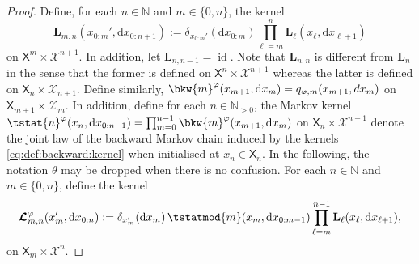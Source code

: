 \documentclass{article}
\newcommand{\Xfd}{\mathcal{X}}
\newcommand{\precpar}{\varphi}
\newcommand{\intvect}[2]{\{ #1, #2 \}}
\newcommand{\nset}{\mathbb{N}}
\newcommand{\nsetpos}{\mathbb{N}_{> 0}}
\newcommand{\1}{\mathbbm{1}}
\newcommand{\retrokmod}{\boldsymbol{\mathcal{L}}^\precpar}
\newcommand{\uk}[1]{\mathbf{L}_{#1}}
\newcommand{\tensprod}{\otimes}
\newcommand{\Xset}{\mathsf{X}}
\newcommand{\parvec}{\theta}
\newcommand{\bmf}[1]{\set{F}(#1)}
\newcommand{\set}[1]{\mathsf{#1}}
\newcommand{\rmd}{\ensuremath{\mathrm{d}}}
\newcommand{\eqdef}{\ensuremath{:=}}
\begin{document}
\begin{proof}
Define, for each $n \in \nset$ and $m \in \intvect{0}{n}$, the kernel 
\begin{equation} \label{eq:def:uk:products}
    \uk{m, n}(x_{0:m}', \rmd x_{0:n + 1}) \eqdef \delta_{x_{0:m}'}(\rmd x_{0:m}) \prod_{\ell = m}^n \uk{\ell}(x_\ell, \rmd x_{\ell + 1}) 
\end{equation}
on $\Xset^m \times \Xfd^{n + 1}$. In addition, let $\uk{n, n - 1} = \operatorname{id}$. Note that $\uk{n, n}$ is different from $\uk{n}$ in the sense that the former is defined on $\Xset^n \times \Xfd^{n + 1}$ whereas the latter is defined on $\Xset_n \times \Xfd_{n + 1}$. Define similarly, $\bkw{m}^\varphi(x_{m + 1}, \rmd x_m) = q_{\varphi,m}(x_{m+1},dx_m)$
on $\Xset_{m + 1} \times \Xfd_m$. In addition, define for each $n \in \nsetpos$, the Markov kernel  $\tstat{n}^\varphi(x_n, \rmd x_{0:n - 1}) = \prod_{m = 0}^{n - 1} \bkw{m}^\varphi(x_{m + 1}, \rmd x_m)$ on $\Xset_n \times \Xfd^{n - 1}$ denote the joint law of the backward Markov chain induced by the kernels \eqref{eq:def:backward:kernel} when initialised at $x_n \in \Xset_n$.  In the following, the notation $\parvec$ may be dropped when there is no confusion. 
 For each $n \in \nset$ and $m \in \intvect{0}{n}$, define the kernel  
\begin{equation} \label{eq:def:retrokmod}
    \retrokmod_{m, n}(x_m', \rmd x_{0:n}) \eqdef \delta_{x_m'}(\rmd x_m) \, \tstatmod{m}(x_m, \rmd x_{0:m - 1}) \prod_{\ell = m}^{n - 1} \uk{\ell}(x_\ell, \rmd x_{\ell + 1}), 
\end{equation}
on $\Xset_m \times \Xfd^n$. 


\end{proof}
\end{document}
